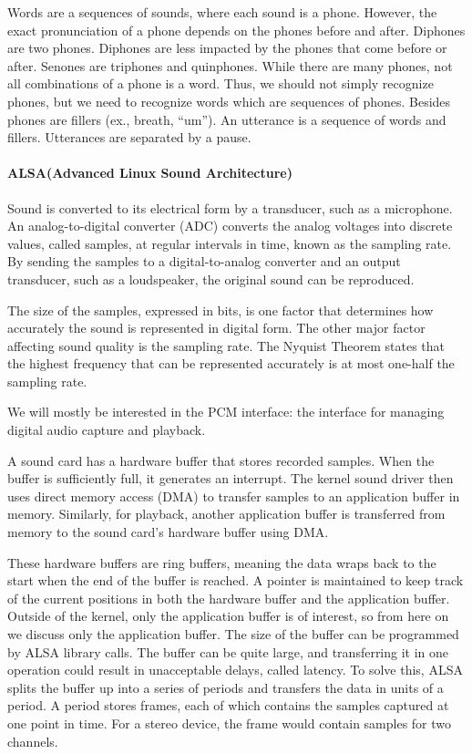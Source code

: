 \documentclass{article}
\begin{document}
Words are a sequences of sounds, where each sound is a phone. However, the exact pronunciation of a phone depends on the phones before and after.
Diphones are two phones. Diphones are less impacted by the phones that come before or after. 
Senones are triphones and quinphones.
While there are many phones, not all combinations of a phone is a word. Thus, we should not simply recognize phones, but we need to recognize words which are sequences of phones.
Besides phones are fillers (ex., breath, “um”). An utterance is a sequence of words and fillers. Utterances are separated by a pause.



\paragraph{ALSA(Advanced Linux Sound Architecture)}
Sound is converted to its electrical form by a transducer, such as a microphone. An analog-to-digital converter (ADC) converts the analog voltages into discrete values, called samples, at regular intervals in time, known as the sampling rate. By sending the samples to a digital-to-analog converter and an output transducer, such as a loudspeaker, the original sound can be reproduced.

The size of the samples, expressed in bits, is one factor that determines how accurately the sound is represented in digital form. The other major factor affecting sound quality is the sampling rate. The Nyquist Theorem states that the highest frequency that can be represented accurately is at most one-half the sampling rate. 

We will mostly be interested in the PCM interface: the interface for managing digital audio capture and playback. 

 A sound card has a hardware buffer that stores recorded samples. When the buffer is sufficiently full, it generates an interrupt. The kernel sound driver then uses direct memory access (DMA) to transfer samples to an application buffer in memory. Similarly, for playback, another application buffer is transferred from memory to the sound card's hardware buffer using DMA.
 
These hardware buffers are ring buffers, meaning the data wraps back to the start when the end of the buffer is reached. A pointer is maintained to keep track of the current positions in both the hardware buffer and the application buffer. Outside of the kernel, only the application buffer is of interest, so from here on we discuss only the application buffer.
The size of the buffer can be programmed by ALSA library calls. The buffer can be quite large, and transferring it in one operation could result in unacceptable delays, called latency. To solve this, ALSA splits the buffer up into a series of periods and transfers the data in units of a period.
A period stores frames, each of which contains the samples captured at one point in time. For a stereo device, the frame would contain samples for two channels.
\end{document}

